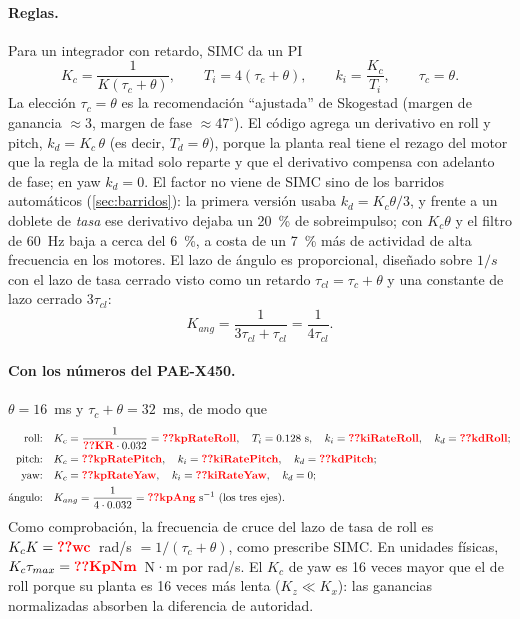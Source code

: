 \paragraph{Reglas.} Para un integrador con retardo, SIMC da un PI
\begin{equation}
K_c=\frac{1}{K(\tau_c+\theta)},\qquad T_i=4(\tau_c+\theta),\qquad k_i=\frac{K_c}{T_i},
\qquad \tau_c=\theta .
\label{eq:simc}
\end{equation}
La elección $\tau_c=\theta$ es la recomendación ``ajustada'' de Skogestad
(margen de ganancia $\approx3$, margen de fase $\approx47^\circ$). El código
agrega un derivativo en roll y pitch, $k_d=K_c\,\theta$ (es decir,
$T_d=\theta$), porque la planta real tiene el rezago del motor que la regla
de la mitad solo reparte y que el derivativo compensa con adelanto de fase;
en yaw $k_d=0$. El factor no viene de SIMC sino de los barridos automáticos
(\cref{sec:barridos}): la primera versión usaba $k_d=K_c\theta/3$, y frente a
un doblete de \emph{tasa} ese derivativo dejaba un 20~\% de sobreimpulso;
con $K_c\theta$ y el filtro de 60~Hz baja a cerca del 6~\%, a costa de un 7~\%
más de actividad de alta frecuencia en los motores. El lazo de
ángulo es proporcional, diseñado sobre $1/s$ con el lazo de tasa cerrado
visto como un retardo $\tau_{cl}=\tau_c+\theta$ y una constante de lazo
cerrado $3\tau_{cl}$:
\begin{equation}
K_{ang}=\frac{1}{3\tau_{cl}+\tau_{cl}}=\frac{1}{4\tau_{cl}}.
\label{eq:kang}
\end{equation}

\paragraph{Con los números del PAE-X450.} $\theta=16$~ms y
$\tau_c+\theta=32$~ms, de modo que
\begin{align*}
\text{roll:}&\quad K_c=\frac{1}{\val{KR}\cdot0.032}=\val{kpRateRoll},\quad T_i=0.128~\text{s},\quad k_i=\val{kiRateRoll},\quad k_d=\val{kdRoll};\\
\text{pitch:}&\quad K_c=\val{kpRatePitch},\quad k_i=\val{kiRatePitch},\quad k_d=\val{kdPitch};\\
\text{yaw:}&\quad K_c=\val{kpRateYaw},\quad k_i=\val{kiRateYaw},\quad k_d=0;\\
\text{ángulo:}&\quad K_{ang}=\frac{1}{4\cdot0.032}=\val{kpAng}~\text{s}^{-1}\ \text{(los tres ejes)}.
\end{align*}
Como comprobación, la frecuencia de cruce del lazo de tasa de roll es
$K_cK=\val{wc}$~rad/s $=1/(\tau_c+\theta)$, como prescribe SIMC. En unidades
físicas, $K_c\tau_{max}=\val{KpNm}$~N·m por rad/s. El $K_c$ de yaw es 16 veces
mayor que el de roll porque su planta es 16 veces más lenta
($K_z\ll K_x$): las ganancias normalizadas absorben la diferencia de
autoridad.

